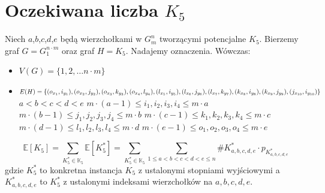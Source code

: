 \documentclass{article}
\begin{document}
\section{Oczekiwana liczba $K_5$}
Niech $a$,$b$,$c$,$d$,$e$ będą wierzchołkami w $G_m^n$ tworzącymi potencjalne $K_5$. 
Bierzemy graf $G = G_1^{n \cdot m}$ oraz graf  $H = K_5$. Nadajemy oznaczenia. Wówczas:
\begin{itemize}
  \item $V(G) = \{1, 2, \ldots n \cdot m\}$
  \item $E(H) = \{(o_{x_1}, i_{y_1}), (o_{x_2}, j_{y_2}), (o_{x_3}, k_{y_3}), (o_{x_4}, l_{y_4}), (l_{x_5}, i_{y_5}), (l_{x_6}, j_{y_6}),  \newline (l_{x_7}, k_{y_7}), (k_{x_8}, i_{y_8}), (k_{x_9}, j_{y_9}), (j_{x_{10}}, i_{y_{10}})\}$
    \subitem $a < b < c < d < e$
    \subitem $m \cdot (a-1) \leq i_1,i_2,i_3,i_4 \leq m \cdot a$
    \subitem $m \cdot (b-1) \leq j_1,j_2,j_3,j_4 \leq m \cdot b$
    \subitem $m \cdot (c-1) \leq k_1,k_2,k_3,k_4 \leq m \cdot c$
    \subitem $m \cdot (d-1) \leq l_1,l_2,l_3,l_4 \leq m \cdot d$
    \subitem $m \cdot (e-1) \leq o_1,o_2,o_3,o_4 \leq m \cdot e$
\end{itemize}

\begin{dmath}
  \mathbb{E}[K_5] = \sum_{K_5^* \in \mathbb{K}_5} \mathbb{E}[K_5^*] =
  \sum_{K_5^* \in \mathbb{K}_5} \sum_{1 \leq a < b < c < d < e \leq n} \#K_{a,b,c,d,e}^* \cdot p_{K_{a,b,c,d,e}^*}
\end{dmath}
gdzie $K_5^*$ to konkretna instancja $K_5$ z ustalonymi stopniami wyjściowymi \newline
a $K_{a,b,c,d,e}^*$ to $K_5^*$ z ustalonymi indeksami wierzchołków na $a,b,c,d,e$.
\end{document}

